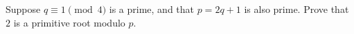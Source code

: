 \documentclass{subfile}
\begin{document}

	\begin{problem}
		Suppose $q\equiv 1\pmod 4$ is a prime, and that $p=2q+1$ is also prime. Prove that $2$ is a primitive root modulo $p$. %
	\end{problem}
\end{document}
